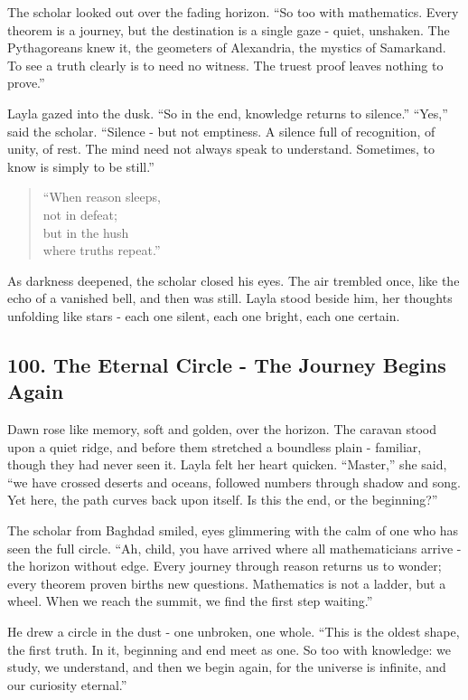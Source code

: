 \documentclass[
  letterpaper,
  DIV=11,
  numbers=noendperiod]{scrreprt}
\begin{document}
The scholar looked out over the fading horizon. ``So too with
mathematics. Every theorem is a journey, but the destination is a single
gaze - quiet, unshaken. The Pythagoreans knew it, the geometers of
Alexandria, the mystics of Samarkand. To see a truth clearly is to need
no witness. The truest proof leaves nothing to prove.''

Layla gazed into the dusk. ``So in the end, knowledge returns to
silence.'' ``Yes,'' said the scholar. ``Silence - but not emptiness. A
silence full of recognition, of unity, of rest. The mind need not always
speak to understand. Sometimes, to know is simply to be still.''

\begin{quote}
``When reason sleeps,\\
not in defeat;\\
but in the hush\\
where truths repeat.''
\end{quote}

As darkness deepened, the scholar closed his eyes. The air trembled
once, like the echo of a vanished bell, and then was still. Layla stood
beside him, her thoughts unfolding like stars - each one silent, each
one bright, each one certain.

\subsection{100. The Eternal Circle - The Journey Begins
Again}\label{the-eternal-circle---the-journey-begins-again}

Dawn rose like memory, soft and golden, over the horizon. The caravan
stood upon a quiet ridge, and before them stretched a boundless plain -
familiar, though they had never seen it. Layla felt her heart quicken.
``Master,'' she said, ``we have crossed deserts and oceans, followed
numbers through shadow and song. Yet here, the path curves back upon
itself. Is this the end, or the beginning?''

The scholar from Baghdad smiled, eyes glimmering with the calm of one
who has seen the full circle. ``Ah, child, you have arrived where all
mathematicians arrive - the horizon without edge. Every journey through
reason returns us to wonder; every theorem proven births new questions.
Mathematics is not a ladder, but a wheel. When we reach the summit, we
find the first step waiting.''

He drew a circle in the dust - one unbroken, one whole. ``This is the
oldest shape, the first truth. In it, beginning and end meet as one. So
too with knowledge: we study, we understand, and then we begin again,
for the universe is infinite, and our curiosity eternal.''
\end{document}
